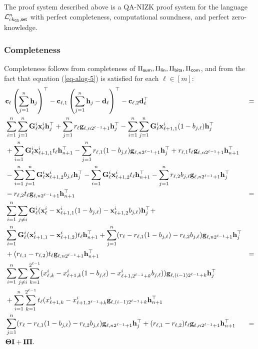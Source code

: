 \begin{theorem} \label{theo:bits}
The proof system described above is a QA-NIZK proof system for the language \(\mathcal{L}_{ck_{\mathsf{GS}},\mathsf{set}}^n\)
 with perfect completeness, computational soundness, and perfect zero-knowledge.
\end{theorem}	

\subsubsection{Completeness}
Completeness follows from completeness of \(\Pi_{\mathsf{sum}},\Pi_\mathsf{lin},\Pi_{\mathsf{bits}},\Pi_{\mathsf{com}}\), and from the fact that equation (\ref{eq-alog-5}) is satisfied for each \(\ell\in [m]\):
\begin{align*}
&\mathbf{c}_\ell\left(\sum_{j=1}^n \mathbf{h}_j\right)^\top-
\mathbf{c}_{\ell,1}\left(\sum_{j=1}^n\mathbf{h}_j-\mathbf{d}_\ell\right)^\top-
\mathbf{c}_{\ell,2}\mathbf{d}_\ell^\top &= \\
&\sum_{i=1}^n\sum_{j=1}^n\mathbf{{G}}_{\ell}^{i}\mathbf{x}^i_{\ell}\mathbf{h}_j^\top+\sum_{j=1}^nr_\ell\mathbf{g}_{\ell,n2^{\ell-1}+1}\mathbf{h}_j^\top
-\sum_{i=1}^n\sum_{j=1}^n\mathbf{{G}}_{\ell}^{i}\mathbf{x}^i_{\ell+1,1}(1-b_{j,\ell})\mathbf{h}_j^\top\\
&+\sum_{i=1}^n\mathbf{{G}}_{\ell}^{i}\mathbf{x}^i_{\ell+1,1} t_\ell\mathbf{h}_{n+1}^\top-\sum_{j=1}^nr_{\ell,1}(1-b_{j,\ell})\mathbf{g}_{\ell,n2^{\ell-1}+1}\mathbf{h}_j^\top+ r_{\ell,1}t_\ell\mathbf{g}_{\ell,n2^{\ell-1}+1}\mathbf{h}_{n+1}^\top\\
&-\sum_{i=1}^n\sum_{j=1}^n\mathbf{{G}}_{\ell}^{i}\mathbf{x}^i_{\ell+1,2}b_{j,\ell}\mathbf{h}_j^\top-\sum_{i=1}^n\mathbf{{G}}_{\ell}^{i}\mathbf{x}^i_{\ell+1,2} t_\ell\mathbf{h}_{n+1}^\top-\sum_{j=1}^nr_{\ell,2}b_{j,\ell}\mathbf{g}_{\ell,n2^{\ell-1}+1}\mathbf{h}_j^\top\\
&- r_{\ell,2}t_\ell\mathbf{g}_{\ell,n2^{\ell-1}+1}\mathbf{h}_{n+1}^\top &=\\
&\sum_{i=1}^n\sum_{j\neq i}\mathbf{{G}}_{\ell}^{i}(\mathbf{x}^i_\ell-\mathbf{x}^i_{\ell+1,1}(1-b_{j,\ell})-\mathbf{x}^i_{\ell+1,2}b_{j,\ell})\mathbf{h}_j^\top+\\
&\sum_{i=1}^n\mathbf{{G}}_{\ell}^{i}(\mathbf{x}^i_{\ell+1,1}-\mathbf{x}^i_{\ell+1,2})t_\ell\mathbf{h}_{n+1}^\top+\sum_{j=1}^n(r_\ell-r_{\ell,1}(1-b_{j,\ell})-r_{\ell,2}b_{j,\ell})\mathbf{g}_{\ell,n2^{\ell-1}+1}\mathbf{h}_{j}^\top\\
&+(r_{\ell,1}-r_{\ell,2})t_\ell\mathbf{g}_{\ell,n2^{\ell-1}+1}\mathbf{h}_{n+1}^\top &=\\
&\sum_{i=1}^n\sum_{j\neq i}\sum_{k=1}^{2^{\ell-1}}(x^i_{\ell,k}-x^i_{\ell+1,k}(1-b_{j,\ell})-x^i_{\ell+1,2^{\ell-1}+k}b_{j,\ell}))\mathbf{g}_{\ell,(i-1)2^{\ell-1}+k}\mathbf{h}_j^\top\\
&+\sum_{i=1}^n\sum_{k=1}^{2^{\ell-1}}t_\ell(x^i_{\ell+1,k}-x^i_{\ell+1,2^{\ell-1}+k}\mathbf{g}_{\ell,(i-1)2^{\ell-1}+k}\mathbf{h}_{n+1}^\top\\
&\sum_{j=1}^n(r_\ell-r_{\ell,1}(1-b_{j,\ell})-r_{\ell,2}b_{j,\ell})\mathbf{g}_{\ell,n2^{\ell-1}+1}\mathbf{h}_{j}^\top+(r_{\ell,1}-r_{\ell,2})t_\ell\mathbf{g}_{\ell,n2^{\ell-1}+1}\mathbf{h}_{n+1}^\top &=\\
&\mathbf{{\Theta}}\mathbf{{I}}+\mathbf{{I}}\mathbf{{\Pi}}.
\end{align*}

